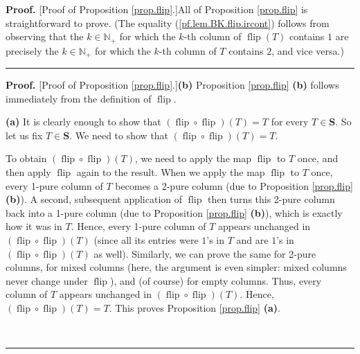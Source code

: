 \documentclass[numbers=enddot,12pt,final,onecolumn,notitlepage]{scrartcl}%
\theoremstyle{definition}
\newenvironment{proof}[1][Proof]{\noindent\textbf{#1.} }{\ \rule{0.5em}{0.5em}}
\newenvironment{verlong}{}{}
\newenvironment{vershort}{}{}
\begin{document}
\begin{vershort}
\begin{proof}
[Proof of Proposition \ref{prop.flip}.]All of Proposition \ref{prop.flip} is
straightforward to prove. (The equality (\ref{pf.lem.BK.flip.ircont}) follows
from observing that the $k \in\mathbb{N}_{+}$ for which the $k$-th column of
$\operatorname*{flip}\left(  T\right)  $ contains $1$ are precisely the $k
\in\mathbb{N}_{+}$ for which the $k$-th column of $T$ contains $2$, and vice versa.)
\end{proof}
\end{vershort}

\begin{verlong}
\begin{proof}
[Proof of Proposition \ref{prop.flip}.]\textbf{(b)} Proposition
\ref{prop.flip} \textbf{(b)} follows immediately from the definition of
$\operatorname*{flip}$.

\textbf{(a)} It is clearly enough to show that $\left(  \operatorname*{flip}%
\circ\operatorname*{flip}\right)  \left(  T\right)  =T$ for every
$T\in\mathbf{S}$. So let us fix $T\in\mathbf{S}$. We need to show that
$\left(  \operatorname*{flip}\circ\operatorname*{flip}\right)  \left(
T\right)  =T$.

To obtain $\left(  \operatorname*{flip}\circ\operatorname*{flip}\right)
\left(  T\right)  $, we need to apply the map $\operatorname*{flip}$ to $T$
once, and then apply $\operatorname*{flip}$ again to the result. When we apply
the map $\operatorname*{flip}$ to $T$ once, every 1-pure column of $T$ becomes
a 2-pure column (due to Proposition \ref{prop.flip} \textbf{(b)}). A second,
subsequent application of $\operatorname*{flip}$ then turns this 2-pure column
back into a 1-pure column (due to Proposition \ref{prop.flip} \textbf{(b)}),
which is exactly how it was in $T$. Hence, every 1-pure column of $T$ appears
unchanged in $\left(  \operatorname*{flip}\circ\operatorname*{flip}\right)
\left(  T\right)  $ (since all its entries were $1$'s in $T$ and are $1$'s in
$\left(  \operatorname*{flip}\circ\operatorname*{flip}\right)  \left(
T\right)  $ as well). Similarly, we can prove the same for 2-pure columns, for
mixed columns (here, the argument is even simpler: mixed columns never change
under $\operatorname*{flip}$), and (of course) for empty columns. Thus, every
column of $T$ appears unchanged in $\left(  \operatorname*{flip}%
\circ\operatorname*{flip}\right)  \left(  T\right)  $. Hence, $\left(
\operatorname*{flip}\circ\operatorname*{flip}\right)  \left(  T\right)  =T$.
This proves Proposition \ref{prop.flip} \textbf{(a)}.


\end{proof}
\end{verlong}
\end{document}
